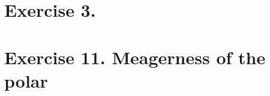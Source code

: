 %
\setcounter{section}{2}
%
\section{Exercise 3. }

\newpage
%
\setcounter{section}{10}
%
\section{Exercise 11. Meagerness of the polar}

